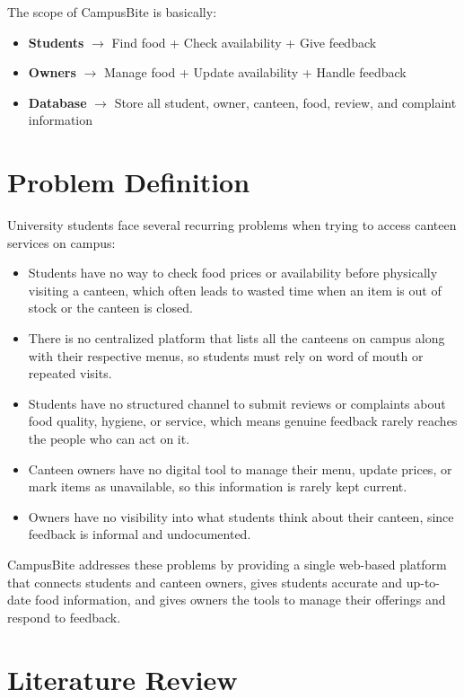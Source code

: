 \documentclass[ 12pt,a4paper,twocolumn,fleqn]{article}
\begin{document}
The scope of CampusBite is basically:
\begin{itemize}
    \item \textbf{Students} $\rightarrow$ Find food + Check availability + Give feedback
    \item \textbf{Owners} $\rightarrow$ Manage food + Update availability + Handle feedback
    \item \textbf{Database} $\rightarrow$ Store all student, owner, canteen, food, review, and complaint information
\end{itemize}

\section{Problem Definition}

University students face several recurring problems when trying to access canteen services on campus:

\begin{itemize}
    \item Students have no way to check food prices or availability before physically visiting a canteen, which often leads to wasted time when an item is out of stock or the canteen is closed.
    \item There is no centralized platform that lists all the canteens on campus along with their respective menus, so students must rely on word of mouth or repeated visits.
    \item Students have no structured channel to submit reviews or complaints about food quality, hygiene, or service, which means genuine feedback rarely reaches the people who can act on it.
    \item Canteen owners have no digital tool to manage their menu, update prices, or mark items as unavailable, so this information is rarely kept current.
    \item Owners have no visibility into what students think about their canteen, since feedback is informal and undocumented.
\end{itemize}

CampusBite addresses these problems by providing a single web-based platform that connects students and canteen owners, gives students accurate and up-to-date food information, and gives owners the tools to manage their offerings and respond to feedback.

\section{Literature Review}
\end{document}

